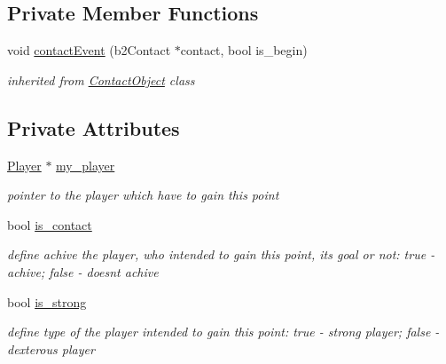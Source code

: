 \subsection*{Private Member Functions}
\begin{DoxyCompactItemize}
\item 
\mbox{\label{class_final_abb9a6e24a09308aed3dfd510074b1201}} 
void \hyperlink{class_final_abb9a6e24a09308aed3dfd510074b1201}{contact\+Event} (b2\+Contact $\ast$contact, bool is\+\_\+begin)
\begin{DoxyCompactList}\small\item\em inherited from \hyperlink{class_contact_object}{Contact\+Object} class \end{DoxyCompactList}\end{DoxyCompactItemize}
\subsection*{Private Attributes}
\begin{DoxyCompactItemize}
\item 
\mbox{\label{class_final_ac09c1e5af1c2317a59fd2bdac39aac9f}} 
\hyperlink{class_player}{Player} $\ast$ \hyperlink{class_final_ac09c1e5af1c2317a59fd2bdac39aac9f}{my\+\_\+player}
\begin{DoxyCompactList}\small\item\em pointer to the player which have to gain this point \end{DoxyCompactList}\item 
\mbox{\label{class_final_a637485b836c9226c062c92a34e0a679d}} 
bool \hyperlink{class_final_a637485b836c9226c062c92a34e0a679d}{is\+\_\+contact}
\begin{DoxyCompactList}\small\item\em define achive the player, who intended to gain this point, its goal or not\+: \textquotesingle{}true\textquotesingle{} -\/ achive; \textquotesingle{}false\textquotesingle{} -\/ doesn\textquotesingle{}t achive \end{DoxyCompactList}\item 
\mbox{\label{class_final_a4beb08f8f72e6339e8544ae121fb717d}} 
bool \hyperlink{class_final_a4beb08f8f72e6339e8544ae121fb717d}{is\+\_\+strong}
\begin{DoxyCompactList}\small\item\em define type of the player intended to gain this point\+: \textquotesingle{}true\textquotesingle{} -\/ strong player; \textquotesingle{}false\textquotesingle{} -\/ dexterous player \end{DoxyCompactList}\end{DoxyCompactItemize}


